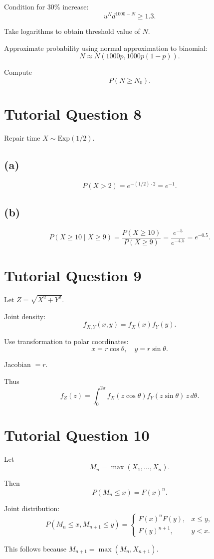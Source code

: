 \documentclass[12pt]{article}
\begin{document}
Condition for $30\%$ increase:
\[
u^N d^{1000-N}\ge1.3.
\]

Take logarithms to obtain threshold value of $N$.

Approximate probability using normal approximation to binomial:
\[
N\approx N(1000p,1000p(1-p)).
\]

Compute
\[
P(N\ge N_0).
\]

\section*{Tutorial Question 8}

Repair time $X\sim \text{Exp}(1/2)$.

\subsection*{(a)}
\[
P(X>2)=e^{-(1/2)\cdot2}=e^{-1}.
\]

\subsection*{(b)}
\[
P(X\ge10\mid X\ge9)
=\frac{P(X\ge10)}{P(X\ge9)}
=\frac{e^{-5}}{e^{-4.5}}
=e^{-0.5}.
\]

\section*{Tutorial Question 9}

Let $Z=\sqrt{X^2+Y^2}$.

Joint density:
\[
f_{X,Y}(x,y)=f_X(x)f_Y(y).
\]

Use transformation to polar coordinates:
\[
x=r\cos\theta,\quad y=r\sin\theta.
\]

Jacobian $=r$.

Thus
\[
f_Z(z)=\int_0^{2\pi}
f_X(z\cos\theta)f_Y(z\sin\theta)\, z\, d\theta.
\]

\section*{Tutorial Question 10}

Let
\[
M_n=\max(X_1,\dots,X_n).
\]

Then
\[
P(M_n\le x)=F(x)^n.
\]

Joint distribution:
\[
P(M_n\le x, M_{n+1}\le y)
=
\begin{cases}
F(x)^nF(y), & x\le y,\\
F(y)^{n+1}, & y<x.
\end{cases}
\]

This follows because $M_{n+1}=\max(M_n,X_{n+1})$.
\end{document}
